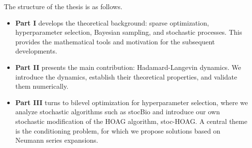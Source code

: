\documentclass[11pt, twoside]{report}
\begin{document}
The structure of the thesis is as follows.
\begin{itemize}
    \item \textbf{Part I} develops the theoretical background: sparse optimization, hyperparameter selection, Bayesian sampling, and stochastic processes. This provides the mathematical tools and motivation for the subsequent developments.
    \item \textbf{Part II} presents the main contribution: Hadamard-Langevin dynamics. We introduce the dynamics, establish their theoretical properties, and validate them numerically.
    \item \textbf{Part III} turns to bilevel optimization for hyperparameter selection,
    where we analyze stochastic algorithms such as stocBio and introduce our own stochastic modification of the HOAG algorithm, stoc-HOAG. A central theme is the
    conditioning problem, for which we propose solutions based on Neumann series expansions.
\end{itemize}
\end{document}
